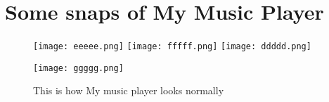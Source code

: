 \documentclass[journal,12pt,twocolumn]{IEEEtran}
\begin{document}
\section*{Some snaps of My Music Player}
	\begin{figure}[htbp]
		\texttt{[image: eeeee.png]}
		\centering
		\texttt{[image: fffff.png]}
		\centering
		\texttt{[image: ddddd.png]}
		\centering
	\end{figure}
	\begin{figure}
	
		\texttt{[image: ggggg.png]}
		\centering
		\caption{This is how My music player looks normally}
		\label{normal}
	\end{figure}
	
\end{document}
